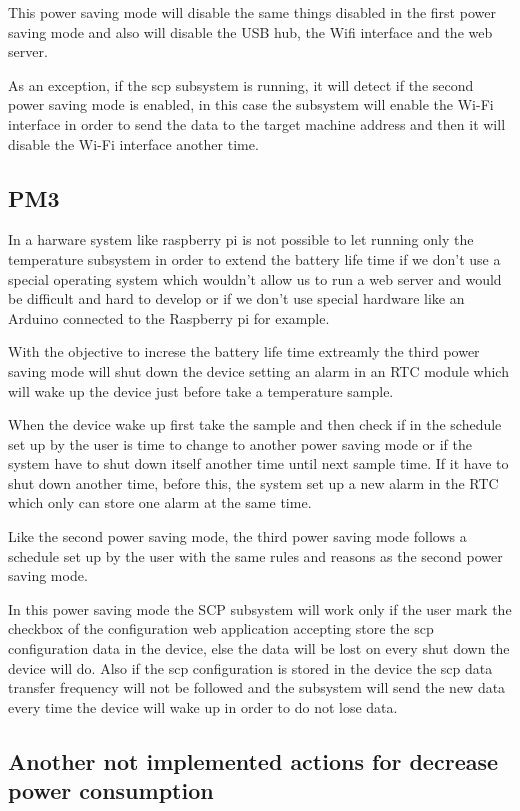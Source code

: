 		This power saving mode will disable the same things disabled in the first power saving mode and also will disable the USB hub, the Wifi interface and the web server.

		As an exception, if the scp subsystem is running, it will detect if the second power saving mode is enabled, in this case the subsystem will enable the Wi-Fi interface in order to send the data to the target machine address and then it will disable the Wi-Fi interface another time.

		\subsection{PM3}\label{sec:pm3}
		In a harware system like raspberry pi is not possible to let running only the temperature subsystem in order to extend the battery life time if we don't use a special operating system which wouldn't allow us to run a web server and would be difficult and hard to develop or if we don't use special hardware like an Arduino connected to the Raspberry pi for example.

		With the objective to increse the battery life time extreamly the third power saving mode will shut down the device setting an alarm in an RTC module which will wake up the device just before take a temperature sample.

		When the device wake up first take the sample and then check if in the schedule set up by the user is time to change to another power saving mode or if the system have to shut down itself another time until next sample time. If it have to shut down another time, before this, the system set up a new alarm in the RTC which only can store one alarm at the same time.

		Like the second power saving mode, the third power saving mode follows a schedule set up by the user with the same rules and reasons as the second power saving mode.

		In this power saving mode the SCP subsystem will work only if the user mark the checkbox of the configuration web application accepting store the scp configuration data in the device, else the data will be lost on every shut down the device will do. Also if the scp configuration is stored in the device the scp data transfer frequency will not be followed and the subsystem will send the new data every time the device will wake up in order to do not lose data.

		\subsection{Another not implemented actions for decrease power consumption}
